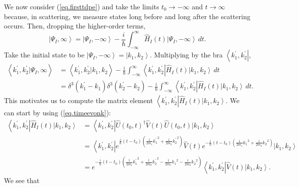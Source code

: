 \documentclass[11pt]{article}
\newcommand{\bra}[1]{\left\langle#1\right|}
\newcommand{\ket}[1]{\left|#1\right\rangle}
\newcommand{\braket}[2]{\left\langle#1|#2\right\rangle}
\newcommand{\op}[1]{\hat{#1}}
\theoremstyle{theorem}
\theoremstyle{remark}
\theoremstyle{step}
\theoremstyle{gap}
\begin{document}
We now consider (\ref{eq.firsttdpe}) and take the limits \(t_0 \to -\infty\) and \(t \to \infty\) because, in scattering, we measure states long before and long after the scattering occurs. Then, dropping the higher-order terms,
\[
\ket{\Psi_I, \infty} = \ket{\Psi_I, -\infty} - \frac{i}{\hbar} \int_{-\infty}^\infty \op{H}_I(t)\ket{\Psi_I, -\infty} \,dt.
\]
Take the initial state to be \(\ket{\Psi_I, -\infty} = \ket{k_1, k_2}\). Multiplying by the bra \(\bra{k_1^\prime, k_2^\prime}\),
\begin{align}
\braket{k_1^\prime, k_2^\prime}{\Psi_I, \infty} &= \braket{k_1^\prime, k_2^\prime}{k_1, k_2} - \frac{i}{\hbar} \int_{-\infty}^\infty \bra{k_1^\prime, k_2^\prime} \op{H}_I(t)\ket{k_1, k_2} \,dt \nonumber\\
&= \delta^3(k_1^\prime - k_1)\delta^3(k_2^\prime - k_2) - \frac{i}{\hbar} \int_{-\infty}^\infty \bra{k_1^\prime, k_2^\prime} \op{H}_I(t)\ket{k_1, k_2} \,dt. \label{eq.intermed}
\end{align}
This motivates us to compute the matrix element \(\bra{k_1^\prime, k_2^\prime} \op{H}_I(t)\ket{k_1, k_2}\). We can start by using (\ref{eq.timeevonk}):
\begin{align*}
\bra{k_1^\prime, k_2^\prime} \op{H}_I(t)\ket{k_1, k_2}
&= \bra{k_1^\prime, k_2^\prime} \op{U}(t_0, t)^\dagger \op{V}(t) \op{U}(t_0, t) \ket{k_1, k_2} \nonumber\\
&= \bra{k_1^\prime, k_2^\prime} e^{\frac{i}{\hbar}\left(t-t_0\right)\left(\frac{1}{2m_1}{k_1^\prime}^2 + \frac{1}{2m_2}{k_2^\prime}^2\right)} \op{V}(t) e^{-\frac{i}{\hbar}\left(t-t_0\right)\left(\frac{1}{2m_1}{k_1}^2 + \frac{1}{2m_2}{k_2}^2\right)} \ket{k_1, k_2} \nonumber\\
&= e^{-\frac{i}{\hbar}\left(t-t_0\right)\left(\frac{1}{2m_1}{k_1^\prime}^2 + \frac{1}{2m_2}{k_2^\prime}^2 - \frac{1}{2m_1}{k_1}^2 - \frac{1}{2m_2}{k_2}^2\right)} \bra{k_1^\prime, k_2^\prime} \op{V}(t) \ket{k_1, k_2}.
\end{align*}
We see that
\end{document}
